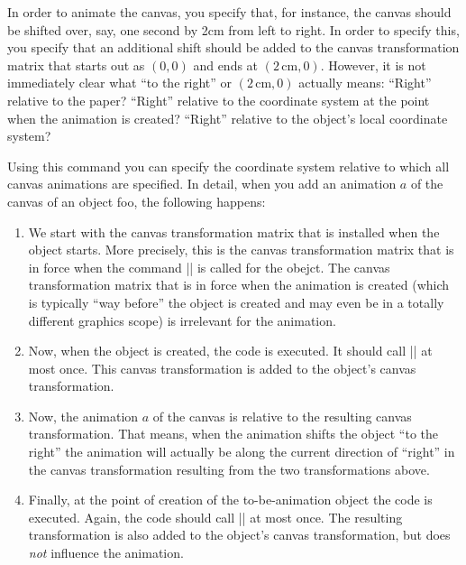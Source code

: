 \begin{command}{\pgfsys@animation@canvas@transform{}}
  In order to animate the canvas, you specify that, for instance, the
  canvas should be shifted over, say, one second by 2cm from left to
  right. In order to specify this, you specify that an additional
  shift should be added to the canvas transformation matrix that
  starts out as $(0,0)$ and ends at $(2\,\mathrm{cm},0)$. However, it
  is not immediately clear what ``to the right'' or
  $(2\,\mathrm{cm},0)$ actually means: ``Right'' relative to the
  paper? ``Right'' relative to the coordinate system at the point when the
  animation is created? ``Right'' relative to the object's local
  coordinate system?

  Using this command you can specify the coordinate system relative to
  which all canvas animations are specified. In detail, when you
  add an animation $a$ of the canvas of an object foo, the following
  happens: 

  \begin{enumerate}
  \item We start with the canvas transformation matrix that is
    installed when the object starts. More precisely, this is the
    canvas transformation matrix that is in force when the command
    |\pgfsys@begin@idscope| is called for the obejct. The canvas
    transformation matrix that is in force when the animation is
    created (which is typically ``way before'' the object is created
    and may even be in a totally different graphics scope) is
    irrelevant for the animation.
  \item Now, when the object is created, the code  is
    executed. It should call |\pgfsys@transformcm| at most once. This
    canvas transformation is added to the object's canvas
    transformation.
  \item Now, the animation $a$ of the canvas is relative to the
    resulting canvas transformation. That means, when the animation
    shifts the object ``to the right'' the animation will actually be
    along the current direction of ``right'' in the canvas
    transformation resulting from the two transformations above.
  \item Finally, at the point of creation of the to-be-animation
    object the code  is executed. Again, the code
    should call |\pgfsys@transformcm| at most once. The resulting
    transformation is also added to the object's canvas
    transformation, but does \emph{not} influence the animation.
  \end{enumerate}


\end{command}
